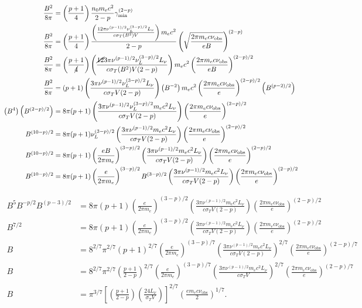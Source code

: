 \documentclass[12pt]{article}
\begin{document}
\begin{align*}
    \frac{B^2}{8\pi} &= \left(\frac{p+1}{4}\right)\frac{n_0m_ec^2}{2-p}\gamma_\mathrm{min}^{(2-p)} \\
    \frac{B^2}{8\pi} &= \left(\frac{p+1}{4}\right)\frac{\left( \frac{12\pi\nu^{(p-1)/2}\nu_L^{(3-p)/2}L_\nu}{c\sigma_T(B^2)V} \right) m_ec^2}{2-p} \left( \sqrt{{\frac{2\pi m_ec\nu_\mathrm{obs}}{eB}}} \right)^{(2-p)} \\
    \frac{B^2}{8\pi} &= \left(\frac{p+1}{\cancel{4}}\right) \left( \frac{\cancel{12}3\pi\nu^{(p-1)/2}\nu_L^{(3-p)/2}L_\nu}{c\sigma_T(B^2)V(2-p)} \right) m_ec^2 \left({\frac{2\pi m_ec\nu_\mathrm{obs}}{eB}} \right)^{(2-p)/2} \\
    \frac{B^2}{8\pi} &= (p+1) \left( \frac{3\pi\nu^{(p-1)/2}\nu_L^{(3-p)/2}L_\nu}{c\sigma_TV(2-p)} \right) \left(B^{-2}\right) m_ec^2 \left({\frac{2\pi m_ec\nu_\mathrm{obs}}{e}} \right)^{(2-p)/2} \left(B^{(p-2)/2}\right) \\
    \left(B^4\right) \left(B^{(2-p)/2}\right) &= 8\pi (p+1) \left( \frac{3\pi\nu^{(p-1)/2}\nu_L^{(3-p)/2}m_ec^2L_\nu}{c\sigma_TV(2-p)} \right) \left({\frac{2\pi m_ec\nu_\mathrm{obs}}{e}} \right)^{(2-p)/2} \\
    B^{(10-p)/2} &= 8\pi (p+1) \nu_L^{(3-p)/2} \left( \frac{3\pi\nu^{(p-1)/2}m_ec^2L_\nu}{c\sigma_TV(2-p)} \right) \left({\frac{2\pi m_ec\nu_\mathrm{obs}}{e}} \right)^{(2-p)/2} \\
    B^{(10-p)/2} &= 8\pi (p+1) \left(\frac{eB}{2\pi m_e}\right)^{(3-p)/2} \left( \frac{3\pi\nu^{(p-1)/2}m_ec^2L_\nu}{c\sigma_TV(2-p)} \right) \left({\frac{2\pi m_ec\nu_\mathrm{obs}}{e}} \right)^{(2-p)/2} \\
    B^{(10-p)/2} &= 8\pi (p+1) \left(\frac{e}{2\pi m_e}\right)^{(3-p)/2} B^{(3-p)/2} \left( \frac{3\pi\nu^{(p-1)/2}m_ec^2L_\nu}{c\sigma_TV(2-p)} \right) \left({\frac{2\pi m_ec\nu_\mathrm{obs}}{e}} \right)^{(2-p)/2}
\end{align*}

\begin{align*}
    B^5B^{-p/2}B^{(p-3)/2} &= 8\pi (p+1) \left(\frac{e}{2\pi m_e}\right)^{(3-p)/2} \left( \frac{3\pi\nu^{(p-1)/2}m_ec^2L_\nu}{c\sigma_TV(2-p)} \right) \left({\frac{2\pi m_ec\nu_\mathrm{obs}}{e}} \right)^{(2-p)/2} \\
    B^{7/2} &= 8\pi (p+1) \left(\frac{e}{2\pi m_e}\right)^{(3-p)/2} \left( \frac{3\pi\nu^{(p-1)/2}m_ec^2L_\nu}{c\sigma_TV(2-p)} \right) \left({\frac{2\pi m_ec\nu_\mathrm{obs}}{e}} \right)^{(2-p)/2} \\
    B &= 8^{2/7}\pi^{2/7} (p+1)^{2/7} \left(\frac{e}{2\pi m_e}\right)^{(3-p)/7} \left( \frac{3\pi\nu^{(p-1)/2}m_ec^2L_\nu}{c\sigma_TV(2-p)} \right)^{2/7} \left({\frac{2\pi m_ec\nu_\mathrm{obs}}{e}} \right)^{(2-p)/7} \\
    B &= 8^{2/7}\pi^{2/7} \left(\frac{p+1}{2-p}\right)^{2/7} \left(\frac{e}{2\pi m_e}\right)^{(3-p)/7} \left( \frac{3\pi\nu^{(p-1)/2}m_ec^2L_\nu}{c\sigma_TV} \right)^{2/7} \left({\frac{2\pi m_ec\nu_\mathrm{obs}}{e}} \right)^{(2-p)/7} \\
    B &= \pi^{3/7} \left[\left(\frac{p+1}{2-p}\right) \left(\frac{24L_\nu}{\sigma_TV}\right)\right]^{2/7} \left(\frac{em_ec\nu_\mathrm{obs}}{2}\right)^{1/7}.
\end{align*}
\end{document}
